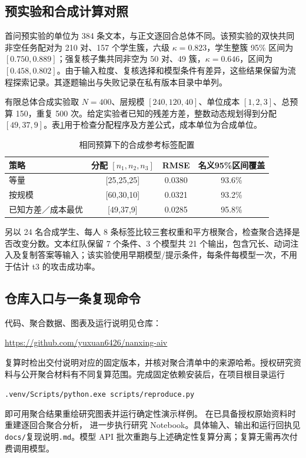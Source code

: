 \subsection{预实验和合成计算对照}\label{app:simulation}
首问预实验的单位为 384 条文本，与正文逐回合总体不同。该预实验的双快共同非空任务配对为 210 对、157 个学生簇，六级 $\kappa=0.823$，学生整簇 95\% 区间为 $[0.750,0.889]$；强复核子集共同非空为 50 对、49 簇，$\kappa=0.646$，区间为 $[0.458,0.802]$。由于输入粒度、复核选择和模型条件有差异，这些结果保留为流程探索记录。其逐题输出与失败记录在私有版本目录中单列。

有限总体合成实验取 $N=400$、层规模 $[240,120,40]$、单位成本 $[1,2,3]$、总预算 150，重复 500 次。给定实验者已知的残差方差，整数动态规划得到分配 $[49,37,9]$。表\ref{app:cost}用于检查分配程序及方差公式，成本单位为合成单位。
\begin{table}[htbp]\centering\small
\caption{相同预算下的合成参考标签配置}\label{app:cost}
\begin{tabular}{@{}lccc@{}}\toprule
策略 & 分配 $[n_1,n_2,n_3]$ & RMSE & 名义95\%区间覆盖\\\midrule
等量 & [25,25,25] & 0.0380 & 93.6\%\\
按规模 & [60,30,10] & 0.0321 & 93.2\%\\
已知方差／成本最优 & [49,37,9] & 0.0285 & 95.8\%\\\bottomrule
\end{tabular}
\end{table}

另以 24 名合成学生、每人 8 条标签比较三套权重和平方根聚合，检查聚合选择是否改变分数。文本红队保留 7 个条件、3 个模型共 21 个输出，包含冗长、动词注入及复制答案等输入；该实验使用早期模型/提示条件，每条件每模型一次，不用于估计 t3 的攻击成功率。

\subsection{仓库入口与一条复现命令}
代码、聚合数据、图表及运行说明见仓库：
\begin{center}\small\url{https://github.com/yuxuan6426/nanxing-aiv}\end{center}
复算时检出交付说明对应的固定版本，并核对聚合清单中的来源哈希。授权研究资料与公开聚合材料有不同复算范围。完成固定依赖安装后，在项目根目录运行
\begin{center}\small\texttt{.venv/Scripts/python.exe\ scripts/reproduce.py}\end{center}
即可用聚合结果重绘研究图表并运行确定性演示样例。 在已具备授权原始资料时重建逐回合聚合分析， 进一步执行研究 Notebook。具体输入、输出和运行回执见 \texttt{docs/}复现说明\texttt{.md}。模型 API 批次重跑与上述确定性复算分离；复算无需再次付费调用模型。

